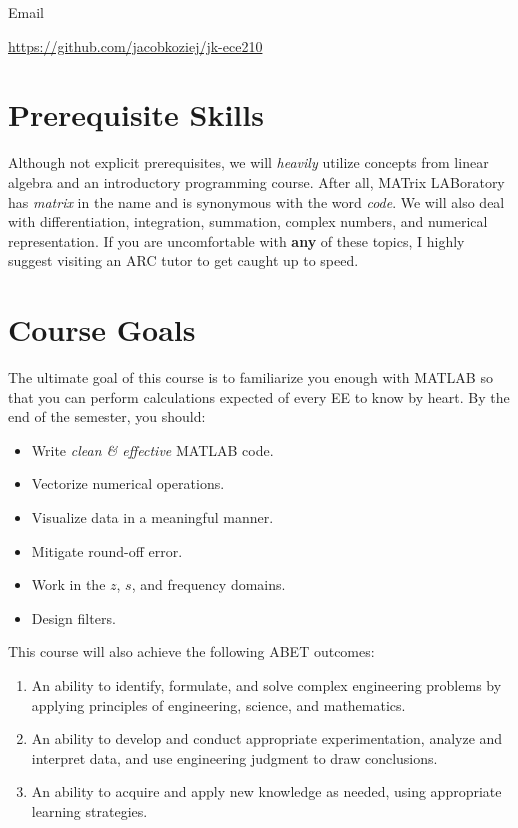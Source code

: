 \documentclass{article}
\begin{document}
 Email

 \url{https://github.com/jacobkoziej/jk-ece210}

\section{Prerequisite Skills}

Although not explicit prerequisites, we will \emph{heavily} utilize
concepts from linear algebra and an introductory programming course.
After all, MATrix  LABoratory has \emph{matrix} in the name and is
synonymous with the word \emph{code}.  We will also deal with
differentiation, integration, summation, complex numbers, and numerical
representation.  If you are uncomfortable with \textbf{any} of these
topics, I highly suggest visiting an ARC tutor to get caught up to
speed.

\section{Course Goals}

The ultimate goal of this course is to familiarize you enough with
MATLAB so that you can perform calculations expected of every EE to know
by heart.  By the end of the semester, you should:

\begin{itemize}
	\item
		Write \emph{clean \& effective} MATLAB code.

	\item
		Vectorize numerical operations.

	\item
		Visualize data in a meaningful manner.

	\item
		Mitigate round-off error.

	\item
		Work in the \(z\), \(s\), and frequency domains.

	\item
		Design filters.
\end{itemize}

This course will also achieve the following ABET outcomes:

\begin{enumerate}
	\slshape

	\item
		An ability to identify, formulate, and solve complex
		engineering problems by applying principles of
		engineering, science, and mathematics.

	\setcounter{enumi}{5}

	\item
		An ability to develop and conduct appropriate
		experimentation, analyze and interpret data, and use
		engineering judgment to draw conclusions.

	\item
		An ability to acquire and apply new knowledge as needed,
		using appropriate learning strategies.
\end{enumerate}
\end{document}

